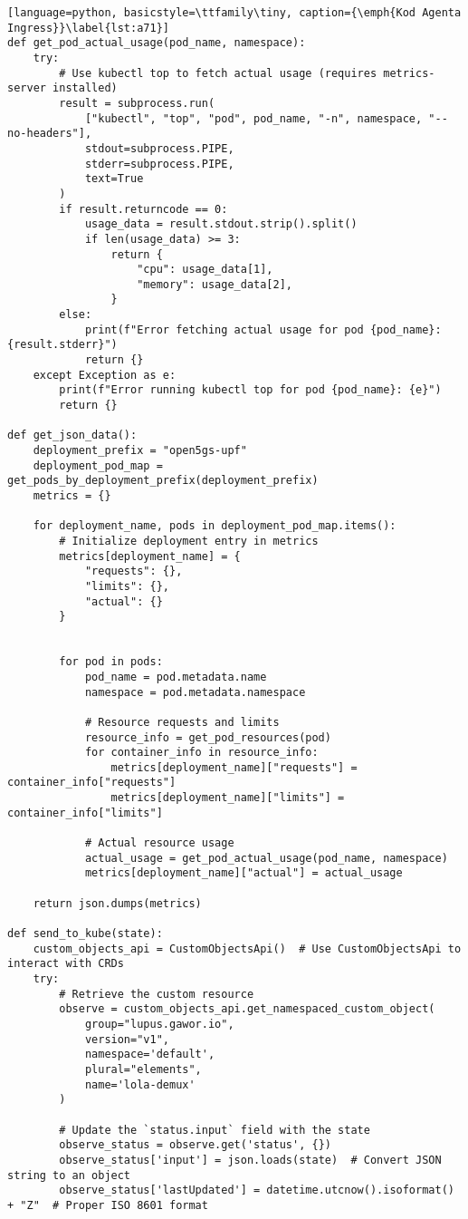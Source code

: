 \begin{lstlisting}[language=python, basicstyle=\ttfamily\tiny, caption={\emph{Kod Agenta Ingress}}\label{lst:a71}]
def get_pod_actual_usage(pod_name, namespace):
    try:
        # Use kubectl top to fetch actual usage (requires metrics-server installed)
        result = subprocess.run(
            ["kubectl", "top", "pod", pod_name, "-n", namespace, "--no-headers"],
            stdout=subprocess.PIPE,
            stderr=subprocess.PIPE,
            text=True
        )
        if result.returncode == 0:
            usage_data = result.stdout.strip().split()
            if len(usage_data) >= 3:
                return {
                    "cpu": usage_data[1],
                    "memory": usage_data[2],
                }
        else:
            print(f"Error fetching actual usage for pod {pod_name}: {result.stderr}")
            return {}
    except Exception as e:
        print(f"Error running kubectl top for pod {pod_name}: {e}")
        return {}

def get_json_data():
    deployment_prefix = "open5gs-upf"
    deployment_pod_map = get_pods_by_deployment_prefix(deployment_prefix)
    metrics = {}

    for deployment_name, pods in deployment_pod_map.items():
        # Initialize deployment entry in metrics
        metrics[deployment_name] = {
            "requests": {},
            "limits": {},
            "actual": {}
        }


        for pod in pods:
            pod_name = pod.metadata.name
            namespace = pod.metadata.namespace

            # Resource requests and limits
            resource_info = get_pod_resources(pod)
            for container_info in resource_info:
                metrics[deployment_name]["requests"] = container_info["requests"]
                metrics[deployment_name]["limits"] = container_info["limits"]

            # Actual resource usage
            actual_usage = get_pod_actual_usage(pod_name, namespace)
            metrics[deployment_name]["actual"] = actual_usage
    
    return json.dumps(metrics)

def send_to_kube(state):
    custom_objects_api = CustomObjectsApi()  # Use CustomObjectsApi to interact with CRDs
    try:
        # Retrieve the custom resource
        observe = custom_objects_api.get_namespaced_custom_object(
            group="lupus.gawor.io",
            version="v1",
            namespace='default',
            plural="elements",
            name='lola-demux'
        )
        
        # Update the `status.input` field with the state
        observe_status = observe.get('status', {})
        observe_status['input'] = json.loads(state)  # Convert JSON string to an object
        observe_status['lastUpdated'] = datetime.utcnow().isoformat() + "Z"  # Proper ISO 8601 format


\end{lstlisting}
